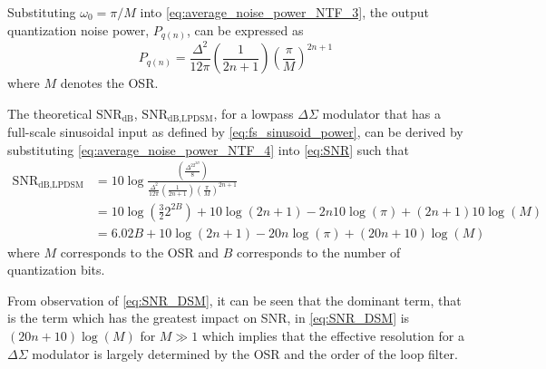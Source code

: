 Substituting $\omega_0=\pi/M$ into \eqref{eq:average_noise_power_NTF_3}, the
output quantization noise power, $P_{q(n)}$, can be expressed as
\begin{equation}\label{eq:average_noise_power_NTF_4}
P_{q(n)}=\frac{\Delta^2}{12\pi}\left(\frac{1}{2n+1}\right)
\left(\frac{\pi}{M}\right)^{2n+1}
\end{equation}
where $M$ denotes the OSR.

The theoretical $\text{SNR}_{\text{dB}}$, $\text{SNR}_\text{dB,LPDSM}$, for a lowpass
$\Delta\Sigma$ modulator that has a full-scale sinusoidal input as defined by
\eqref{eq:fs_sinusoid_power}, can be derived by substituting
\eqref{eq:average_noise_power_NTF_4} into \eqref{eq:SNR} such that
\begin{equation}\label{eq:SNR_DSM}
\begin{split}
\text{SNR}_\text{dB,LPDSM}& =
10\log\frac{\left(\displaystyle\frac{\Delta^22^{2B}}{8}\right)}
{\displaystyle\frac{\Delta^2}{12\pi}\left(\frac{1}{2n+1}\right)
    \left(\frac{\pi}{M}\right)^{2n+1}}\\
&
=10\log\left(\frac{3}{2}2^{2B}
\right)+10\log\left(2n+1\right)-2n10\log(\pi)+(2n+1)10\log (M)
\\
& = 6.02B + 10\log(2n+1) - 20n\log(\pi)+(20n+10)\log(M)
\end{split}
\end{equation}
where $M$ corresponds to the OSR and $B$ corresponds to the number of quantization
bits.
 
From observation of \eqref{eq:SNR_DSM}, it can be seen that the dominant term, that is the
term which has the greatest impact on SNR, in \eqref{eq:SNR_DSM} is $(20n+10)\log(M)$ for
$M\gg1$ which implies that the effective resolution for a $\Delta\Sigma$ modulator is
largely determined by the OSR and the order of the loop filter.